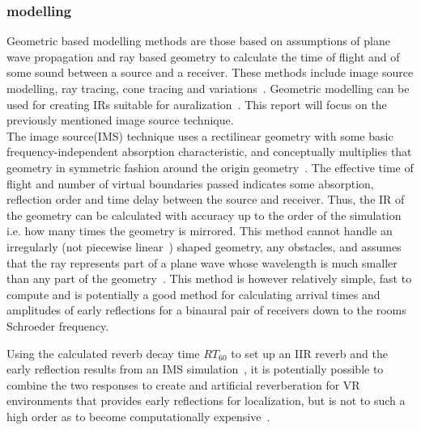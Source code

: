 \documentclass{svproc}
\begin{document}
\subsubsection{modelling}
Geometric based modelling methods are those based on assumptions of plane wave propagation and ray based geometry to calculate the time of flight and  of some sound between a source and a receiver. These methods include image source modelling, ray tracing, cone tracing and variations~\cite{Elorza2005}. Geometric modelling can be used for creating IRs suitable for auralization~\cite{Oxnard2012}. This report will focus on the previously mentioned image source technique.\\

The image source(IMS) technique uses a rectilinear geometry with some basic frequency-independent absorption characteristic, and conceptually multiplies that geometry in symmetric fashion around the origin geometry~\cite{Allen1979}. The effective time of flight and number of virtual boundaries passed indicates some absorption, reflection order and time delay between the source and receiver. Thus, the IR of the geometry can be calculated with accuracy up to the order of the simulation i.e. how many times the geometry is mirrored. This method cannot handle an irregularly (not piecewise linear~\cite{Borish1984}) shaped geometry, any obstacles, and assumes that the ray represents part of a plane wave whose wavelength is much smaller than any part of the geometry~\cite{Elorza2005}. This method is however relatively simple, fast to compute and is potentially a good method for calculating arrival times and amplitudes of early reflections for a binaural pair of receivers down to the rooms Schroeder frequency.


Using the calculated reverb decay time $RT_{60}$ to set up an IIR reverb and the early reflection results from an IMS simulation~\cite{Oxnard2012}, it is potentially possible to combine the two responses to create and artificial reverberation for VR environments that provides early reflections for localization, but is not to such a high order as to become computationally expensive~\cite{Lee2010}. \\
\end{document}
